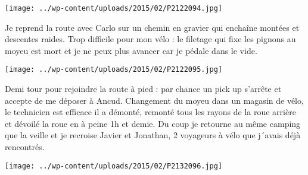 \centerline{\texttt{[image: ../wp-content/uploads/2015/02/P2122094.jpg]} } 
 Je reprend la route avec Carlo sur un chemin en gravier qui enchaîne montées et descentes raides. \newline
 Trop difficile pour mon vélo : le filetage qui fixe les pignons au moyeu est mort et je ne peux plus avancer car je pédale dans le vide. \newline
 \newline
\centerline{\texttt{[image: ../wp-content/uploads/2015/02/P2122095.jpg]} } 
 Demi tour pour rejoindre la route à pied : par chance un pick up s'arrête et accepte de me déposer à Ancud. \newline
 Changement du moyeu dans un magasin de vélo, le technicien est efficace il a démonté, remonté tous les rayons de la roue arrière et dévoilé la roue en à peine 1h et demie. \newline
 Du coup je retourne au même camping que la veille et je recroise Javier et Jonathan, 2 voyageurs à vélo que j´avais déjà rencontrés. \newline
 \newline
\centerline{\texttt{[image: ../wp-content/uploads/2015/02/P2132096.jpg]} } 
 \newline

\newpage
 
